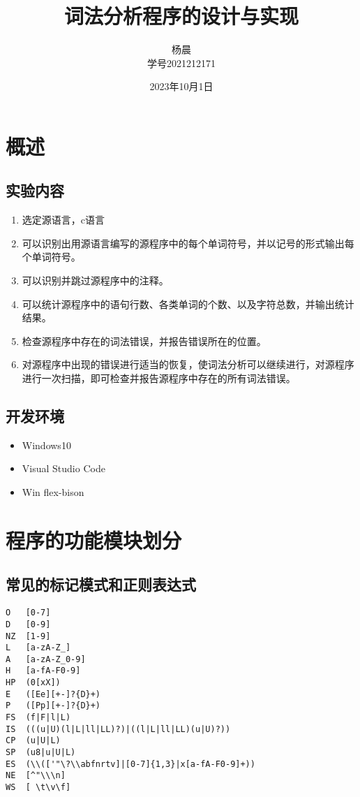 \documentclass[lang=cn,11pt,a4paper]{elegantpaper}
\title{词法分析程序的设计与实现}
\author{杨晨 \\学号2021212171}
\institute{北京邮电大学 计算机学院}
\date{2023年10月1日}
\begin{document}
\maketitle
\tableofcontents

\section{概述}

\subsection{实验内容}

\begin{enumerate}
    \item 选定源语言，c语言
    \item 可以识别出用源语言编写的源程序中的每个单词符号，并以记号的形式输出每个单词符号。
    \item 可以识别并跳过源程序中的注释。
    \item 可以统计源程序中的语句行数、各类单词的个数、以及字符总数，并输出统计结果。
    \item 检查源程序中存在的词法错误，并报告错误所在的位置。
    \item 对源程序中出现的错误进行适当的恢复，使词法分析可以继续进行，对源程序进行一次扫描，即可检查并报告源程序中存在的所有词法错误。
\end{enumerate}

\subsection{开发环境}

\begin{itemize}
    \item Windows10
    \item Visual Studio Code
    \item Win flex-bison
\end{itemize}

\section{程序的功能模块划分}

\subsection{常见的标记模式和正则表达式}


\begin{lstlisting}
O   [0-7]  
D   [0-9] 
NZ  [1-9] 
L   [a-zA-Z_] 
A   [a-zA-Z_0-9] 
H   [a-fA-F0-9] 
HP  (0[xX]) 
E   ([Ee][+-]?{D}+) 
P   ([Pp][+-]?{D}+) 
FS  (f|F|l|L) 
IS  (((u|U)(l|L|ll|LL)?)|((l|L|ll|LL)(u|U)?)) 
CP  (u|U|L) 
SP  (u8|u|U|L) 
ES  (\\(['"\?\\abfnrtv]|[0-7]{1,3}|x[a-fA-F0-9]+)) 
NE  [^"\\\n] 
WS  [ \t\v\f]
\end{lstlisting}
\end{document}
